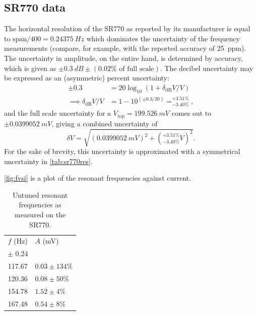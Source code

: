\documentclass{article}
\begin{document}
\subsection{SR770 data}
The horizontal resolution of the SR770 as reported by its manufacturer is equal to $\text{span}/400=\qty{0.24375}{Hz}$ which dominates the uncertainty of the frequency measurements (compare, for example, with the reported accuracy of \qty{25}{ppm}). The uncertainty in amplitude, on the entire hand, is determined by accuracy, which is given as $\pm\qty{0.3}{dB}\pm (0.02\%\text{ of full scale})$. The decibel uncertainty may be expressed as an (asymmetric) percent uncertainty:
\begin{equation*}
  \begin{aligned}
    \pm 0.3 &= 20 \log_{10}\left( 1 + \delta_\text{dB}V/V \right) \\
    \implies \delta_\text{dB}V/V &= 1- 10^{(\pm0.3/20)} = ^{+3.51\%}_{-3.40\%}%
    ,
  \end{aligned}
\end{equation*}
and the full scale uncertainty for a $V_\text{top}=\qty{199.526}{mV}$ comes out to $\pm \qty{0.0399052}{mV}$, giving a combined uncertainty of
\begin{equation*}
  \delta V = \sqrt{\left( \qty{0.0399052}{mV} \right)^2 + \left( ^{+3.51\%}_{-3.40\%} V \right)^2}.
\end{equation*}
For the sake of brevity, this uncertainty is approximated with a symmetrical uncertainty in \autoref{tab:sr770res}.

\autoref{fig:fvsi} is a plot of the resonant frequencies against current.

\begin{table}
  \centering
  \caption{Untuned resonant frequencies as measured on the SR770.}
  \begin{tabular}{@{}cl@{}}
    \toprule
    $f$ (\unit{Hz}) & $A$ (\unit{mV}) \\
    $\pm$ 0.24 & \\
    \midrule
    117.67 & $0.03 \pm 134\%$ \\
    120.36 & $0.08 \pm 50\%$ \\
    154.78 & $1.52 \pm 4\%$ \\
    167.48 & $0.54 \pm 8\%$ \\
    \bottomrule
  \end{tabular}
  \label{tab:sr770res}
\end{table}
\end{document}
